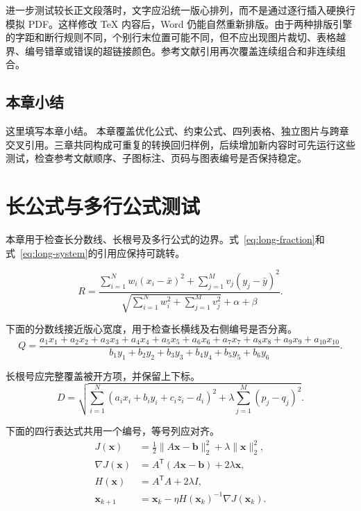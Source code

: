\documentclass[UTF8,zihao=-4,openany,twoside]{ctexbook}
\numberwithin{equation}{chapter}
\begin{document}
进一步测试较长正文段落时，文字应沿统一版心排列，而不是通过逐行插入硬换行模拟 PDF。这样修改 TeX 内容后，Word 仍能自然重新排版。由于两种排版引擎的字距和断行规则不同，个别行末位置可能不同，但不应出现图片裁切、表格越界、编号错章或错误的超链接颜色。参考文献引用再次覆盖连续组合\cite{hu2019,astrom2008,zhou2016}和非连续组合\cite{he2016,hu2019,achenbach1973}。
\section{本章小结}
这里填写本章小结。
本章覆盖优化公式、约束公式、四列表格、独立图片与跨章交叉引用。三章共同构成可重复的转换回归样例，后续增加新内容时可先运行这些测试，检查参考文献顺序、子图标注、页码与图表编号是否保持稳定。

\chapter{长公式与多行公式测试}
本章用于检查长分数线、长根号及多行公式的边界。式~\eqref{eq:long-fraction}和式~\eqref{eq:long-system}的引用应保持可跳转。

\begin{equation}
 R=\frac{\sum_{i=1}^{N}w_i\left(x_i-\bar{x}\right)^2+\sum_{j=1}^{M}v_j\left(y_j-\bar{y}\right)^2}{\sqrt{\sum_{i=1}^{N}w_i^2+\sum_{j=1}^{M}v_j^2}+\alpha+\beta}.
 \label{eq:long-fraction}
\end{equation}

下面的分数线接近版心宽度，用于检查长横线及右侧编号是否分离。
\begin{equation}
 Q=\frac{a_1x_1+a_2x_2+a_3x_3+a_4x_4+a_5x_5+a_6x_6+a_7x_7+a_8x_8+a_9x_9+a_{10}x_{10}}{b_1y_1+b_2y_2+b_3y_3+b_4y_4+b_5y_5+b_6y_6}.
 \label{eq:wide-bar}
\end{equation}

长根号应完整覆盖被开方项，并保留上下标。
\begin{equation}
 D=\sqrt{\sum_{i=1}^{N}\left(a_i x_i+b_i y_i+c_i z_i-d_i\right)^2+\lambda\sum_{j=1}^{M}\left(p_j-q_j\right)^2}.
 \label{eq:long-root}
\end{equation}

下面的四行表达式共用一个编号，等号列应对齐。
\begin{equation}
 \begin{aligned}
 J(\mathbf{x})&=\frac{1}{2}\|A\mathbf{x}-\mathbf{b}\|_2^2+\lambda\|\mathbf{x}\|_2^2,\\
 \nabla J(\mathbf{x})&=A^{\mathsf{T}}(A\mathbf{x}-\mathbf{b})+2\lambda\mathbf{x},\\
 H(\mathbf{x})&=A^{\mathsf{T}}A+2\lambda I,\\
 \mathbf{x}_{k+1}&=\mathbf{x}_k-\eta H(\mathbf{x}_k)^{-1}\nabla J(\mathbf{x}_k).
 \end{aligned}
 \label{eq:long-system}
\end{equation}
\end{document}
